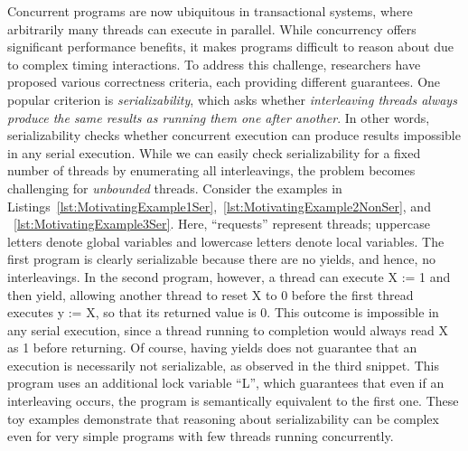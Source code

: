 Concurrent programs are now ubiquitous in transactional systems, where arbitrarily many threads can execute in parallel.
While concurrency offers significant performance benefits, it makes programs difficult to reason about due to complex timing interactions.
%
To address this challenge, researchers have proposed various correctness criteria, each providing different guarantees.
One popular criterion is \textit{serializability}, which asks whether \textit{interleaving threads always produce the same results as running them one after another}. In other words, serializability checks whether concurrent execution can produce results impossible in any serial execution.
%
While we can easily check serializability for a fixed number of threads by enumerating all interleavings, the problem becomes challenging for \textit{unbounded} threads. Consider the examples in Listings~\ref{lst:MotivatingExample1Ser},~\ref{lst:MotivatingExample2NonSer}, and ~\ref{lst:MotivatingExample3Ser}. Here, ``requests'' represent threads; uppercase letters denote global variables and lowercase letters denote local variables.
%
The first program is clearly serializable because there are no yields, and hence, no interleavings. In the second program, however, a thread can execute X := 1 and then yield, allowing another thread to reset X to 0 before the first thread executes y := X, so that its returned value is 0. This outcome is impossible in any serial execution, since a thread running to completion would always read X as 1 before returning.
Of course, having yields does not guarantee that an execution is necessarily not serializable, as observed in the third snippet. This program uses an additional lock variable ``L'', which guarantees that even if an interleaving occurs, the program is semantically equivalent to the first one.
%
These toy examples demonstrate that reasoning about serializability can be complex even for very simple programs with few threads running concurrently.
%


